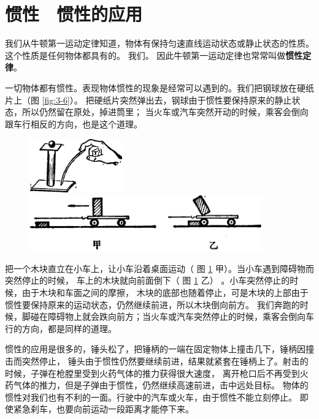\section{惯性　惯性的应用}\label{sec:3-7}

我们从牛顿第一运动定律知道，物体有保持匀速直线运动状态或静止状态的性质。这个性质是任何物体都具有的。
我们。
因此牛顿第一运动定律也常常叫做\textbf{惯性定律}。

一切物体都有惯性。表现物体惯性的现象是经常可以遇到的。我们把钢球放在硬纸片上（图 \ref{fig:3-6}）。
把硬纸片突然弹出去，钢球由于惯性要保持原来的静止状态，所以仍然留在原处，掉进筒里；
当火车或汽车突然开动的时候，乘客会倒向跟车行相反的方向，也是这个道理。

\begin{figure}[htbp]
    \centering
    \begin{minipage}{4cm}
    \centering
    \includegraphics[width=4cm]{../pic/czwl1-ch3-6}
    \caption{}\label{fig:3-6}
    \end{minipage}
    \qquad
    \begin{minipage}{10cm}
    \centering
    \includegraphics[width=10cm]{../pic/czwl1-ch3-7}
    \caption{}\label{fig:3-7}
    \end{minipage}
\end{figure}



把一个木块直立在小车上，让小车沿着桌面运动（ 图 \ref{fig:3-7} 甲）。当小车遇到障碍物而突然停止的时候，
车上的木块就向前面倒下（ 图 \ref{fig:3-7} 乙） 。小车突然停止的时候，由于木块和车面之间的摩擦，
木块的底部也随着停止，可是木块的上部由于惯性要保持原来的运动状态，仍然继续前进，所以木块倒向前方。
我们奔跑的时候，脚碰在障碍物上就会跌向前方；当火车或汽车突然停止的时候，乘客会倒向车行的方向，都是同样的道理。

惯性的应用是很多的，锤头松了，把锤柄的一端在固定物体上撞击几下，锤柄因撞击而突然停止，
锤头由于惯性仍然要继续前进，结果就紧套在锤柄上了。射击的时候，子弹在枪膛里受到火药气体的推力获得很大速度，
离开枪口后不再受到火药气体的推力，但是子弹由于惯性，仍然继续高速前进，击中远处目标。
物体的惯性对我们也有不利的一面。行驶中的汽车或火车，由于惯性不能立刻停止。
即使紧急刹车，也要向前运动一段距离才能停下来。


